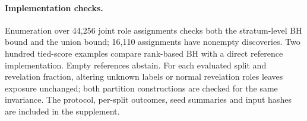 \paragraph{Implementation checks.}
Enumeration over 44,256 joint role assignments checks both the stratum-level BH bound and the union bound; 16,110 assignments have nonempty discoveries. Two hundred tied-score examples compare rank-based BH with a direct reference implementation. Empty references abstain. For each evaluated split and revelation fraction, altering unknown labels or normal revelation roles leaves exposure unchanged; both partition constructions are checked for the same invariance. The protocol, per-split outcomes, seed summaries and input hashes are included in the supplement.


